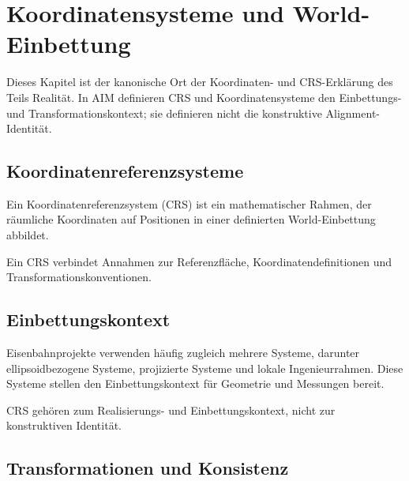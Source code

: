 
\chapter{Koordinatensysteme und World-Einbettung}
\label{chap:coordinate-systems}


Dieses Kapitel ist der kanonische Ort der Koordinaten- und CRS-Erklärung des
Teils Realität. In AIM definieren CRS und Koordinatensysteme den Einbettungs-
und Transformationskontext; sie definieren nicht die konstruktive
Alignment-Identität.



\section{Koordinatenreferenzsysteme}

\begin{definition}[Koordinatenreferenzsystem]
Ein Koordinatenreferenzsystem (CRS) ist ein mathematischer Rahmen, der
räumliche Koordinaten auf Positionen in einer definierten World-Einbettung
abbildet.
\end{definition}

Ein CRS verbindet Annahmen zur Referenzfläche, Koordinatendefinitionen und
Transformationskonventionen.

\section{Einbettungskontext}

Eisenbahnprojekte verwenden häufig zugleich mehrere Systeme, darunter
ellipsoidbezogene Systeme, projizierte Systeme und lokale Ingenieurrahmen.
Diese Systeme stellen den Einbettungskontext für Geometrie und Messungen bereit.

\begin{principle}
CRS gehören zum Realisierungs- und Einbettungskontext, nicht zur
konstruktiven Identität.
\end{principle}

\section{Transformationen und Konsistenz}


